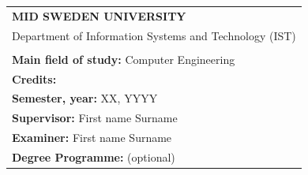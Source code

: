 \begin{titlepage}
  \setlength\headheight{60pt}
  \renewcommand{\headrulewidth}{0pt}
  \thispagestyle{fancy}
  \fancyhf{}
  \fancyfoot{}
    \vspace*{0.5cm}
    {\selectfont{%
    	\Large{\textbf{\gettitle}}}
      \\
      \\
      \large{} %
    \\
    \\
    \\
    	\large{\getauthor}}
    \vspace*{13cm}

    \renewcommand{\arraystretch}{0.5}
    \begin{tabular}{l}
    \footnotesize{\textbf{MID SWEDEN UNIVERSITY}}\\
    \footnotesize{Department of Information Systems and Technology (IST)}\\
          \\

      \footnotesize{\textbf{Main field of study:} Computer Engineering }\\
      \footnotesize{\textbf{Credits:}  }\\
      \footnotesize{\textbf{Semester, year:} XX, YYYY}\\
      \footnotesize{\textbf{Supervisor:} First name Surname}\\
      \footnotesize{\textbf{Examiner:} First name Surname}\\
      \footnotesize{\textbf{Degree Programme:} (optional)}\\
    \end{tabular}
  \end{titlepage}
